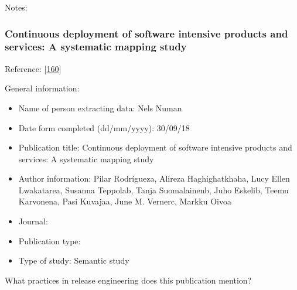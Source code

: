 \documentclass[]{book}
\providecommand{\tightlist}{%
  \setlength{\itemsep}{0pt}\setlength{\parskip}{0pt}}
\begin{document}
Notes:

\subsubsection{Continuous deployment of software intensive products and
services: A systematic mapping
study}\label{continuous-deployment-of-software-intensive-products-and-services-a-systematic-mapping-study}

Reference: {[}\protect\hyperlink{ref-rodriguez2017a}{160}{]}

General information:

\begin{itemize}
\tightlist
\item
  Name of person extracting data: Nels Numan
\item
  Date form completed (dd/mm/yyyy): 30/09/18
\item
  Publication title: Continuous deployment of software intensive
  products and services: A systematic mapping study
\item
  Author information: Pilar Rodrígueza, Alireza Haghighatkhaha, Lucy
  Ellen Lwakatarea, Susanna Teppolab, Tanja Suomalainenb, Juho Eskelib,
  Teemu Karvonena, Pasi Kuvajaa, June M. Vernerc, Markku Oivoa
\item
  Journal:
\item
  Publication type:
\item
  Type of study: Semantic study
\end{itemize}

What practices in release engineering does this publication mention?
\end{document}
